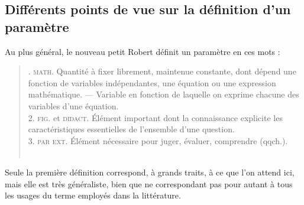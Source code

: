\subsection{Différents points de vue sur la définition d'un paramètre}

Au plus général, le nouveau petit Robert définit un paramètre en ces mots :
\begin{quote}
	. \textsc{math.} Quantité à fixer librement, maintenue constante, dont dépend une fonction de variables indépendantes, une équation ou une expression mathématique. --- Variable en fonction de laquelle on exprime chacune des variables d'une équation.\\
	2. \textsc{fig.} et \textsc{didact.} Élément important dont la connaissance explicite les caractéristiques essentielles de l'ensemble d'une question.\\
	3. \textsc{par ext.} Élément nécessaire pour juger, évaluer, comprendre (qqch.).\fg{}\\
	\mbox{}~ \hfill \autocite[\textbf{Paramètre}]{robert_nouveau_1993}
\end{quote}


Seule la première définition correspond, à grands traits, à ce que l'on attend ici, mais elle est très généraliste, bien que ne correspondant pas pour autant à tous les usages du terme employés dans la littérature.

